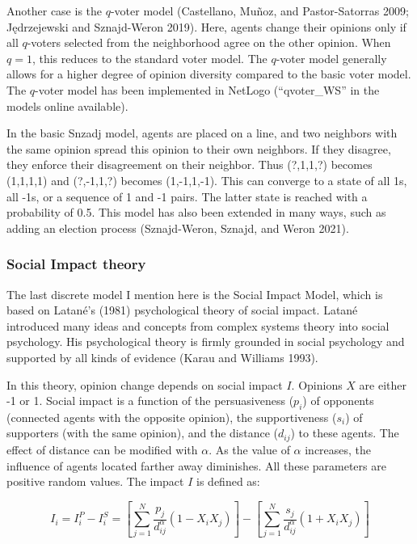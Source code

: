 \documentclass[
  a4paper,
  DIV=11,
  numbers=noendperiod]{scrreprt}
\begin{document}
Another case is the \(q\)-voter model (Castellano, Muñoz, and
Pastor-Satorras 2009; Jędrzejewski and Sznajd-Weron 2019). Here, agents
change their opinions only if all \(q\)-voters selected from the
neighborhood agree on the other opinion. When \(q = 1\), this reduces to
the standard voter model. The \(q\)-voter model generally allows for a
higher degree of opinion diversity compared to the basic voter model.
The \(q\)-voter model has been implemented in NetLogo (``qvoter\_WS'' in
the models online available).

In the basic Snzadj model, agents are placed on a line, and two
neighbors with the same opinion spread this opinion to their own
neighbors. If they disagree, they enforce their disagreement on their
neighbor. Thus (?,1,1,?) becomes (1,1,1,1) and (?,-1,1,?) becomes
(1,-1,1,-1). This can converge to a state of all 1s, all -1s, or a
sequence of 1 and -1 pairs. The latter state is reached with a
probability of 0.5. This model has also been extended in many ways, such
as adding an election process (Sznajd-Weron, Sznajd, and Weron 2021).

\hypertarget{sec-Social-Impact-theory}{%
\subsubsection{Social Impact theory}\label{sec-Social-Impact-theory}}

The last discrete model I mention here is the Social Impact Model, which
is based on Latané's (1981) psychological theory of social impact.
Latané introduced many ideas and concepts from complex systems theory
into social psychology. His psychological theory is firmly grounded in
social psychology and supported by all kinds of evidence (Karau and
Williams 1993).

In this theory, opinion change depends on social impact \(I\). Opinions
\(X\) are either -1 or 1. Social impact is a function of the
persuasiveness (\(p_{i}\)) of opponents (connected agents with the
opposite opinion), the supportiveness (\(s_{i}\)) of supporters (with
the same opinion), and the distance (\(d_{ij}\)) to these agents. The
effect of distance can be modified with \(\alpha\). As the value of
\(\alpha\) increases, the influence of agents located farther away
diminishes. All these parameters are positive random values. The impact
\(I\) is defined as:

\[I_{i} = I_{i}^{P} - I_{i}^{S} = \left\lbrack \sum_{j = 1}^{N}{\frac{p_{j}}{d_{ij}^{\alpha}}\left( 1 - X_{i}X_{j} \right)} \right\rbrack - \left\lbrack \sum_{j = 1}^{N}{\frac{s_{j}}{d_{ij}^{\alpha}}\left( 1 + X_{i}X_{j} \right)} \right\rbrack\]
\end{document}
